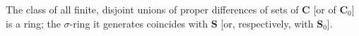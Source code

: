 The class of all finite, disjoint unions of proper differences of sets of $\mathbf{C}$ [or of $\mathbf{C}_0$] is a ring; the $\sigma$-ring it generates coincides with $\mathbf{S}$ [or, respectively, with $\mathbf{S}_0$].
